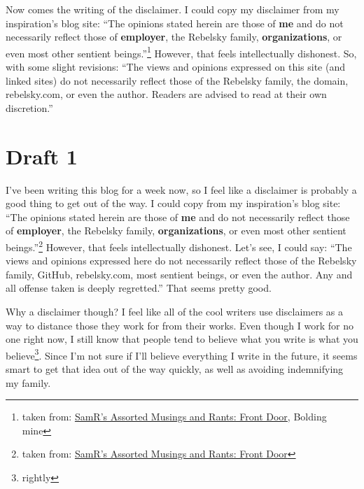 \documentclass[12pt]{article}[titlepage]
\newcommand{\say}[1]{``#1''}
\newcommand{\1}{\={a}}
\newcommand{\2}{\={e}}
\newcommand{\3}{\={\i}}
\newcommand{\4}{\=o}
\newcommand{\5}{\=u}
\newcommand{\6}{\={A}}
\renewcommand{\,}{\textsuperscript{,}}
\begin{document}
Now comes the writing of the disclaimer.
I could copy my disclaimer from my inspiration's blog site: \say{The opinions stated herein are those of \textbf{me} and do not necessarily reflect those of \textbf{employer}, the Rebelsky family, \textbf{organizations}, or even most other sentient beings.}\footnote{taken from: \href{http://www.cs.grinnell.edu/~rebelsky/musings/}{SamR's Assorted Musings and Rants: Front Door}, Bolding mine}
However, that feels intellectually dishonest.
So, with some slight revisions: \say{The views and opinions expressed on this site (and linked sites) do not necessarily reflect those of the Rebelsky family, the domain, rebelsky.com, or even the author.
Readers are advised to read at their own discretion.}

\section{Draft 1}
I've been writing this blog for a week now, so I feel like a disclaimer is probably a good thing to get out of the way.
I could copy from my inspiration's blog site: \say{The opinions stated herein are those of \textbf{me} and do not necessarily reflect those of \textbf{employer}, the Rebelsky family, \textbf{organizations}, or even most other sentient beings.}\footnote{taken from: \href{http://www.cs.grinnell.edu/~rebelsky/musings/}{SamR's Assorted Musings and Rants: Front Door}}
However, that feels intellectually dishonest.
Let's see, I could say: \say{The views and opinions expressed here do not necessarily reflect those of the Rebelsky family, GitHub, rebelsky.com, most sentient beings, or even the author.
Any and all offense taken is deeply regretted.}
That seems pretty good.

Why a disclaimer though?
I feel like all of the cool writers use disclaimers as a way to distance those they work for from their works.
Even though I work for no one right now, I still know that people tend to believe what you write is what you believe\footnote{rightly}.
Since I'm not sure if I'll believe everything I write in the future, it seems smart to get that idea out of the way quickly, as well as avoiding indemnifying my family.
\end{document}
